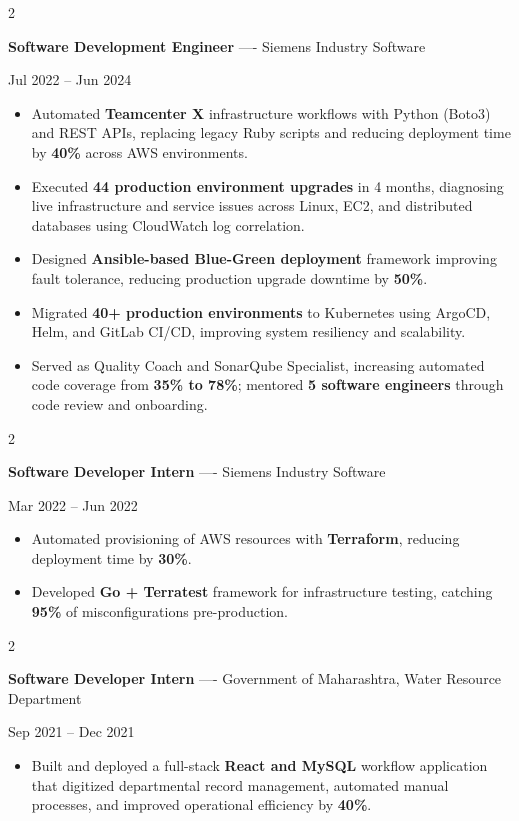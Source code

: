 \documentclass[10pt, letterpaper]{article}
\newenvironment{highlights}{
    \begin{itemize}[
        topsep=0.10 cm,
        parsep=0.06 cm,
        partopsep=0pt,
        itemsep=0.06 cm,
        leftmargin=12pt
    ]
}{
    \end{itemize}
}
\newenvironment{twocolentry}[2][]{
    \onecolentry
    \def\secondColumn{#2}
    \setcolumnwidth{\fill, 4.5 cm}
    \begin{paracol}{2}
}{
    \switchcolumn \raggedleft \secondColumn
    \end{paracol}
    \endonecolentry
}
\begin{document}
\vspace{0.15 cm}

\begin{twocolentry}{Jul 2022 -- Jun 2024}
\textbf{Software Development Engineer} ---- Siemens Industry Software
\end{twocolentry}
\begin{highlights}
  \item Automated \textbf{Teamcenter X} infrastructure workflows with Python (Boto3) and REST APIs, replacing legacy Ruby scripts and reducing deployment time by \textbf{40\%} across AWS environments.
  \item Executed \textbf{44 production environment upgrades} in 4 months, diagnosing live infrastructure and service issues across Linux, EC2, and distributed databases using CloudWatch log correlation.
  \item Designed \textbf{Ansible-based Blue-Green deployment} framework improving fault tolerance, reducing production upgrade downtime by \textbf{50\%}.
  \item Migrated \textbf{40+ production environments} to Kubernetes using ArgoCD, Helm, and GitLab CI/CD, improving system resiliency and scalability.
  \item Served as Quality Coach and SonarQube Specialist, increasing automated code coverage from \textbf{35\% to 78\%}; mentored \textbf{5 software engineers} through code review and onboarding.
\end{highlights}

\vspace{0.15 cm}

\begin{twocolentry}{Mar 2022 -- Jun 2022}
\textbf{Software Developer Intern} ---- Siemens Industry Software
\end{twocolentry}
\begin{highlights}
  \item Automated provisioning of AWS resources with \textbf{Terraform}, reducing deployment time by \textbf{30\%}.
  \item Developed \textbf{Go + Terratest} framework for infrastructure testing, catching \textbf{95\%} of misconfigurations pre-production.
\end{highlights}

\vspace{0.15 cm}

\begin{twocolentry}{Sep 2021 -- Dec 2021}
\textbf{Software Developer Intern} ---- Government of Maharashtra, Water Resource Department
\end{twocolentry}
\begin{highlights}
  \item Built and deployed a full-stack \textbf{React and MySQL} workflow application that digitized departmental record management, automated manual processes, and improved operational efficiency by \textbf{40\%}.
\end{highlights}
\end{document}
